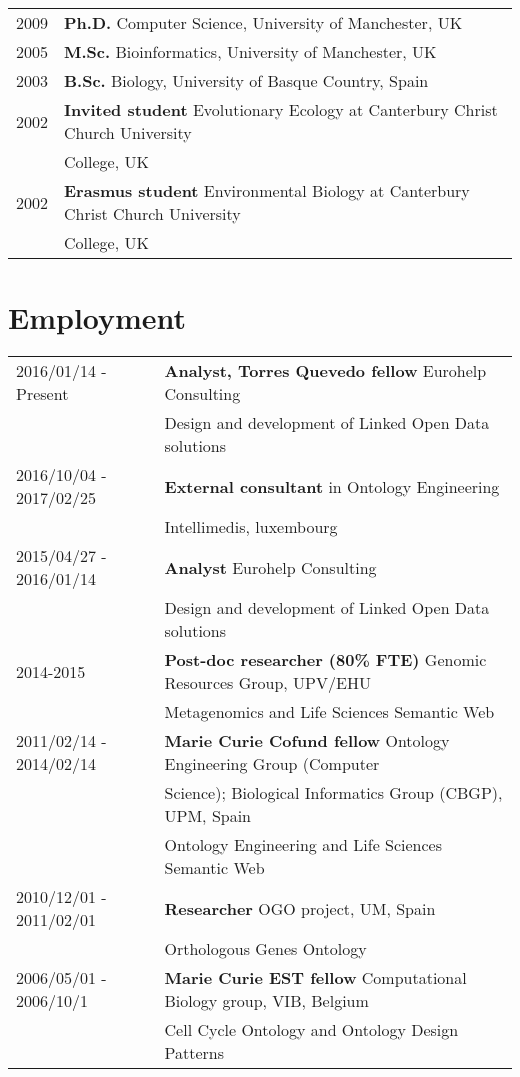 \documentclass[11pt,fullpage]{article}
\begin{document}
\begin{tabular}{ll}
	2009 & {\bf Ph.D.} Computer Science, University of Manchester, UK \\
	2005 & {\bf M.Sc.} Bioinformatics, University of Manchester, UK \\
	2003 & {\bf B.Sc.} Biology, University of Basque Country, Spain \\
	2002 & {\bf Invited student} Evolutionary Ecology at Canterbury Christ Church University \\
	     & College, UK \\
	2002 & {\bf Erasmus student} Environmental Biology at Canterbury Christ Church University \\
	     & College, UK \\
\end{tabular}

\section*{Employment}


\begin{tabular}{ll}
2016/01/14 - Present & {\bf Analyst, Torres Quevedo fellow} Eurohelp Consulting \\
	      & Design and development of Linked Open Data solutions\\
2016/10/04 - 2017/02/25 & {\bf External consultant} in Ontology Engineering \\
        & Intellimedis, luxembourg \\
 2015/04/27 -  2016/01/14 & {\bf Analyst} Eurohelp Consulting \\
	    & Design and development of Linked Open Data solutions\\
 2014-2015 & {\bf Post-doc researcher (80\% FTE)} Genomic Resources Group, UPV/EHU  \\
	  & Metagenomics and Life Sciences Semantic Web \\
 2011/02/14 - 2014/02/14 & {\bf Marie Curie Cofund fellow} Ontology Engineering Group (Computer \\
	    & Science); Biological Informatics Group (CBGP), UPM, Spain \\
	    & Ontology Engineering and Life Sciences Semantic Web \\
 2010/12/01 - 2011/02/01 & {\bf Researcher} OGO project, UM, Spain \\
      & Orthologous Genes Ontology \\
 2006/05/01 - 2006/10/1 & {\bf Marie Curie EST fellow} Computational Biology group, VIB, Belgium \\
     & Cell Cycle Ontology and Ontology Design Patterns \\
\end{tabular}
\end{document}
